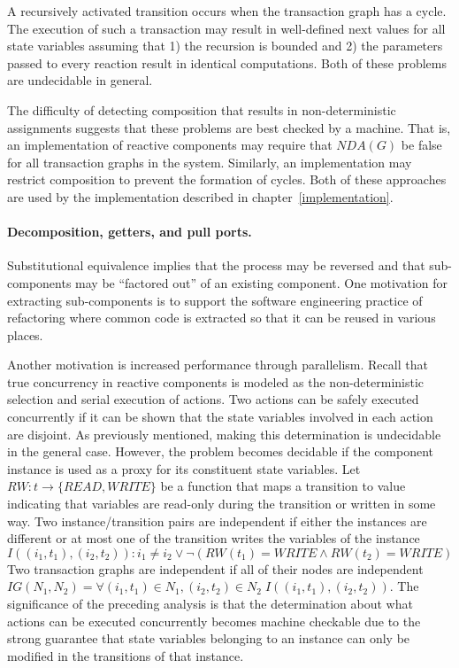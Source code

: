 A recursively activated transition occurs when the transaction graph has a cycle.
The execution of such a transaction may result in well-defined next values for all state variables assuming that 1) the recursion is bounded and 2) the parameters passed to every reaction result in identical computations.
Both of these problems are undecidable in general.

The difficulty of detecting composition that results in non-deterministic assignments suggests that these problems are best checked by a machine.
That is, an implementation of reactive components may require that $NDA(G)$ be false for all transaction graphs in the system.
Similarly, an implementation may restrict composition to prevent the formation of cycles.
Both of these approaches are used by the implementation described in chapter~\ref{implementation}.

\paragraph{Decomposition, getters, and pull ports.}
Substitutional equivalence implies that the process may be reversed and that sub-components may be ``factored out'' of an existing component.
One motivation for extracting sub-components is to support the software engineering practice of refactoring where common code is extracted so that it can be reused in various places.

Another motivation is increased performance through parallelism.
Recall that true concurrency in reactive components is modeled as the non-deterministic selection and serial execution of actions.
Two actions can be safely executed concurrently if it can be shown that the state variables involved in each action are disjoint.
As previously mentioned, making this determination is undecidable in the general case.
However, the problem becomes decidable if the component instance is used as a proxy for its constituent state variables.
Let $RW: t \to \{ READ, WRITE \}$ be a function that maps a transition to value indicating that variables are read-only during the transition or written in some way.
Two instance/transition pairs are independent if either the instances are different or at most one of the transition writes the variables of the instance
\begin{displaymath}
I((i_1, t_1), (i_2, t_2)): i_1 \ne i_2 \lor \lnot (RW(t_1) = WRITE \land RW(t_2) = WRITE)
\end{displaymath}
Two transaction graphs are independent if all of their nodes are independent $IG(N_1, N_2) = \forall (i_1, t_1) \in N_1, (i_2, t_2) \in N_2 \; I((i_1, t_1), (i_2, t_2))$.
The significance of the preceding analysis is that the determination about what actions can be executed concurrently becomes machine checkable due to the strong guarantee that state variables belonging to an instance can only be modified in the transitions of that instance.

